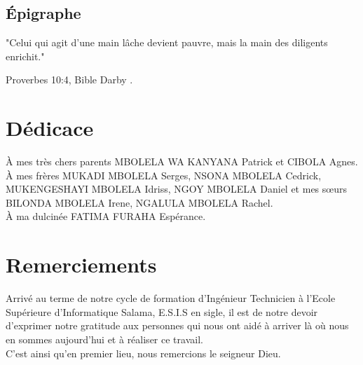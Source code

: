 \documentclass[a4paper,12pt]{report}
\begin{document}
    \newpage

    

    \begin{center}
        \chapter*{Épigraphe}
        \vspace{50pt}
         "Celui qui agit d'une main lâche devient pauvre, mais la main des diligents enrichit."
        \begin{flushright}
            Proverbes 10:4, Bible Darby .
        \end{flushright}
    \end{center}

    

    \chapter*{Dédicace}
    
    \begin{em}
        À mes très chers parents MBOLELA WA KANYANA Patrick \-et CIBOLA Agnes.
        \\
        À mes frères MUKADI MBOLELA Serges, NSONA MBOLELA Cedrick, MUKENGESHAYI MBOLELA Idriss,
        NGOY MBOLELA Daniel et mes sœurs BILONDA MBOLELA Irene, NGALULA MBOLELA Rachel.
        \\
        À ma dulcinée FATIMA FURAHA Espérance.    
    \end{em}
        
    

    
    \chapter*{Remerciements}
    

    Arrivé au terme de notre cycle de formation d’Ingénieur Technicien à l’Ecole Supérieure d’Informatique Salama, 
    E.S.I.S en sigle, il est de notre devoir d’exprimer notre gratitude aux personnes qui nous ont aidé à 
    arriver là où nous en sommes aujourd’hui et à réaliser ce travail.
    \\
    C’est ainsi qu’en premier lieu, nous remercions le seigneur Dieu.
    \\
    
\end{document}
